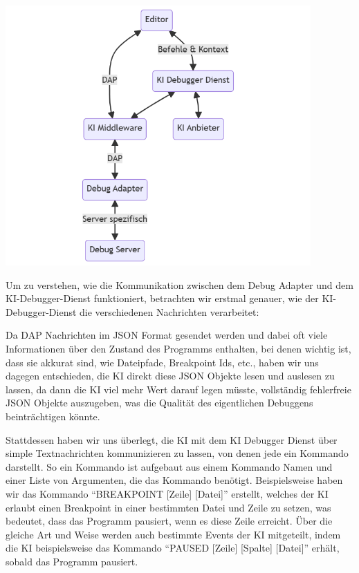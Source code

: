 \documentclass[a4paper,12pt,ngerman]{scrartcl}
\begin{document}
\begin{center}	
	\includegraphics[width=0.875\textwidth]{ai_integration}
\end{center}

Um zu verstehen, wie die Kommunikation zwischen dem Debug Adapter und dem KI-Debugger-Dienst funktioniert, betrachten wir erstmal genauer, wie der KI-Debugger-Dienst die verschiedenen Nachrichten verarbeitet:

Da DAP Nachrichten im JSON Format gesendet werden und dabei oft viele Informationen über den Zustand des Programms enthalten, bei denen wichtig ist, dass sie akkurat sind, wie Dateipfade, Breakpoint Ids, etc., haben wir uns dagegen entschieden, die KI direkt diese JSON Objekte lesen und auslesen zu lassen, da dann die KI viel mehr Wert darauf legen müsste, vollständig fehlerfreie JSON Objekte auszugeben, was die Qualität des eigentlichen Debuggens beinträchtigen könnte.

Stattdessen haben wir uns überlegt, die KI mit dem KI Debugger Dienst über simple Textnachrichten kommunizieren zu lassen, von denen jede ein Kommando darstellt. So ein Kommando ist aufgebaut aus einem Kommando Namen und einer Liste von Argumenten, die das Kommando benötigt. Beispielsweise haben wir das Kommando ``BREAKPOINT [Zeile] [Datei]'' erstellt, welches der KI erlaubt einen Breakpoint in einer bestimmten Datei und Zeile zu setzen, was bedeutet, dass das Programm pausiert, wenn es diese Zeile erreicht. Über die gleiche Art und Weise werden auch bestimmte Events der KI mitgeteilt, indem die KI beispielsweise das Kommando ``PAUSED [Zeile] [Spalte] [Datei]'' erhält, sobald das Programm pausiert.
\end{document}
